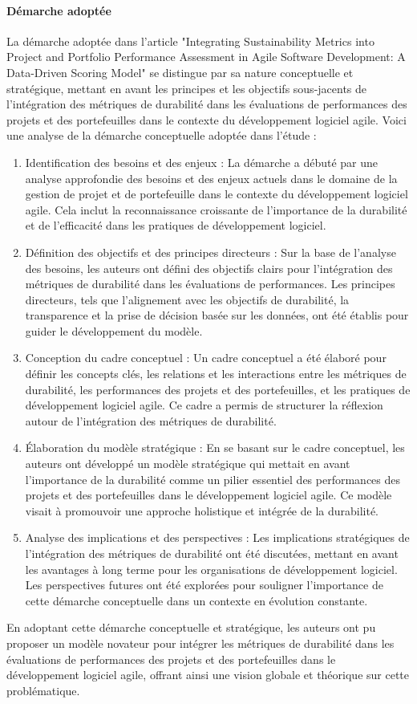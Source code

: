 \paragraph{Démarche adoptée}
La démarche adoptée dans l'article "Integrating Sustainability Metrics into Project and Portfolio Performance Assessment in Agile Software Development: A Data-Driven Scoring Model" se distingue par sa nature conceptuelle et stratégique, mettant en avant les principes et les objectifs sous-jacents de l'intégration des métriques de durabilité dans les évaluations de performances des projets et des portefeuilles dans le contexte du développement logiciel agile. Voici une analyse de la démarche conceptuelle adoptée dans l'étude :
\begin{enumerate}
    \item Identification des besoins et des enjeux : La démarche a débuté par une analyse approfondie des besoins et des enjeux actuels dans le domaine de la gestion de projet et de portefeuille dans le contexte du développement logiciel agile. Cela inclut la reconnaissance croissante de l'importance de la durabilité et de l'efficacité dans les pratiques de développement logiciel.
    \item Définition des objectifs et des principes directeurs : Sur la base de l'analyse des besoins, les auteurs ont défini des objectifs clairs pour l'intégration des métriques de durabilité dans les évaluations de performances. Les principes directeurs, tels que l'alignement avec les objectifs de durabilité, la transparence et la prise de décision basée sur les données, ont été établis pour guider le développement du modèle.
    \item Conception du cadre conceptuel : Un cadre conceptuel a été élaboré pour définir les concepts clés, les relations et les interactions entre les métriques de durabilité, les performances des projets et des portefeuilles, et les pratiques de développement logiciel agile. Ce cadre a permis de structurer la réflexion autour de l'intégration des métriques de durabilité.
    \item Élaboration du modèle stratégique : En se basant sur le cadre conceptuel, les auteurs ont développé un modèle stratégique qui mettait en avant l'importance de la durabilité comme un pilier essentiel des performances des projets et des portefeuilles dans le développement logiciel agile. Ce modèle visait à promouvoir une approche holistique et intégrée de la durabilité.
    \item Analyse des implications et des perspectives : Les implications stratégiques de l'intégration des métriques de durabilité ont été discutées, mettant en avant les avantages à long terme pour les organisations de développement logiciel. Les perspectives futures ont été explorées pour souligner l'importance de cette démarche conceptuelle dans un contexte en évolution constante.
\end{enumerate}
En adoptant cette démarche conceptuelle et stratégique, les auteurs ont pu proposer un modèle novateur pour intégrer les métriques de durabilité dans les évaluations de performances des projets et des portefeuilles dans le développement logiciel agile, offrant ainsi une vision globale et théorique sur cette problématique.

